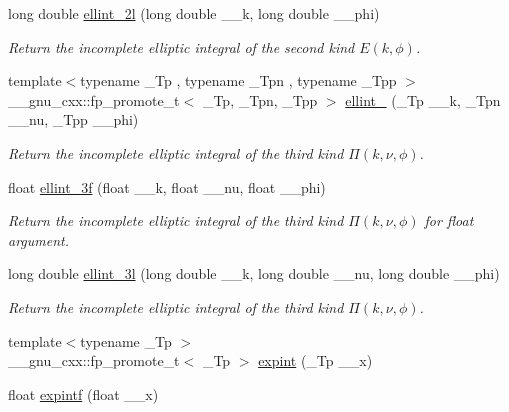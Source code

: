 \begin{DoxyCompactItemize}
long double \hyperlink{group__cxx17__math__spec__func_ga5c791332d374a809d8ca16c69a1a30f5}{ellint\+\_\+2l} (long double \+\_\+\+\_\+k, long double \+\_\+\+\_\+phi)
\begin{DoxyCompactList}\small\item\em Return the incomplete elliptic integral of the second kind $ E(k,\phi) $. \end{DoxyCompactList}\item 
{\footnotesize template$<$typename \+\_\+\+Tp , typename \+\_\+\+Tpn , typename \+\_\+\+Tpp $>$ }\\\+\_\+\+\_\+gnu\+\_\+cxx\+::fp\+\_\+promote\+\_\+t$<$ \+\_\+\+Tp, \+\_\+\+Tpn, \+\_\+\+Tpp $>$ \hyperlink{group__cxx17__math__spec__func_gaac0240d1e7e401e652b9d1adf4c7e029}{ellint\+\_} (\+\_\+\+Tp \+\_\+\+\_\+k, \+\_\+\+Tpn \+\_\+\+\_\+nu, \+\_\+\+Tpp \+\_\+\+\_\+phi)
\begin{DoxyCompactList}\small\item\em Return the incomplete elliptic integral of the third kind $ \Pi(k,\nu,\phi) $. \end{DoxyCompactList}\item 
float \hyperlink{group__cxx17__math__spec__func_ga1a80bd2c15bc9fbecda2630a9e9409e7}{ellint\+\_\+3f} (float \+\_\+\+\_\+k, float \+\_\+\+\_\+nu, float \+\_\+\+\_\+phi)
\begin{DoxyCompactList}\small\item\em Return the incomplete elliptic integral of the third kind $ \Pi(k,\nu,\phi) $ for {\ttfamily float} argument. \end{DoxyCompactList}\item 
long double \hyperlink{group__cxx17__math__spec__func_gaa8c0e5864df8769021a7f3e21a30c5d2}{ellint\+\_\+3l} (long double \+\_\+\+\_\+k, long double \+\_\+\+\_\+nu, long double \+\_\+\+\_\+phi)
\begin{DoxyCompactList}\small\item\em Return the incomplete elliptic integral of the third kind $ \Pi(k,\nu,\phi) $. \end{DoxyCompactList}\item 
{\footnotesize template$<$typename \+\_\+\+Tp $>$ }\\\+\_\+\+\_\+gnu\+\_\+cxx\+::fp\+\_\+promote\+\_\+t$<$ \+\_\+\+Tp $>$ \hyperlink{group__cxx17__math__spec__func_ga0e9ac717a106ef54184b5f058c451782}{expint} (\+\_\+\+Tp \+\_\+\+\_\+x)
\item 
float \hyperlink{group__cxx17__math__spec__func_ga5842816f6eed2594e0a327df4e4a2a47}{expintf} (float \+\_\+\+\_\+x)

\end{DoxyCompactItemize}
